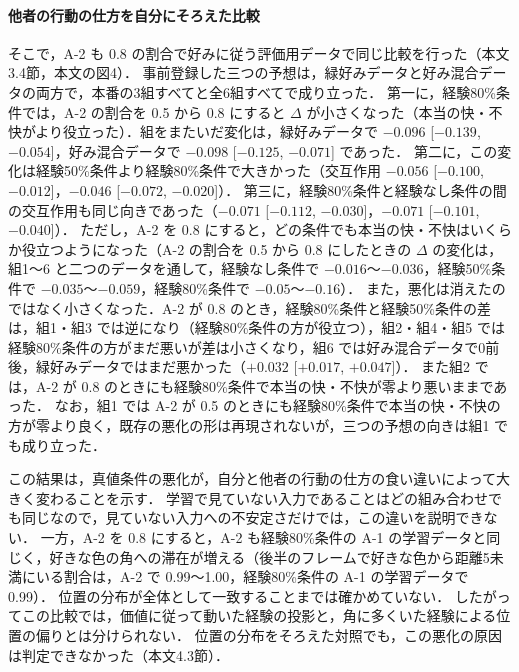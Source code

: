 \paragraph{他者の行動の仕方を自分にそろえた比較}
そこで，A-2 も 0.8 の割合で好みに従う評価用データで同じ比較を行った（本文3.4節，本文の図4）．
事前登録した三つの予想は，緑好みデータと好み混合データの両方で，本番の3組すべてと全6組すべてで成り立った．
第一に，経験80\%条件では，A-2 の割合を 0.5 から 0.8 にすると $\Delta$ が小さくなった（本当の快・不快がより役立った）．組をまたいだ変化は，緑好みデータで $-0.096$ [$-0.139$, $-0.054$]，好み混合データで $-0.098$ [$-0.125$, $-0.071$] であった．
第二に，この変化は経験50\%条件より経験80\%条件で大きかった（交互作用 $-0.056$ [$-0.100$, $-0.012$]，$-0.046$ [$-0.072$, $-0.020$]）．
第三に，経験80\%条件と経験なし条件の間の交互作用も同じ向きであった（$-0.071$ [$-0.112$, $-0.030$]，$-0.071$ [$-0.101$, $-0.040$]）．
ただし，A-2 を 0.8 にすると，どの条件でも本当の快・不快はいくらか役立つようになった（A-2 の割合を 0.5 から 0.8 にしたときの $\Delta$ の変化は，組1〜6 と二つのデータを通して，経験なし条件で $-0.016$〜$-0.036$，経験50\%条件で $-0.035$〜$-0.059$，経験80\%条件で $-0.05$〜$-0.16$）．
また，悪化は消えたのではなく小さくなった．A-2 が 0.8 のとき，経験80\%条件と経験50\%条件の差は，組1・組3 では逆になり（経験80\%条件の方が役立つ），組2・組4・組5 では経験80\%条件の方がまだ悪いが差は小さくなり，組6 では好み混合データで0前後，緑好みデータではまだ悪かった（$+0.032$ [$+0.017$, $+0.047$]）．
また組2 では，A-2 が 0.8 のときにも経験80\%条件で本当の快・不快が零より悪いままであった．
なお，組1 では A-2 が 0.5 のときにも経験80\%条件で本当の快・不快の方が零より良く，既存の悪化の形は再現されないが，三つの予想の向きは組1 でも成り立った．

この結果は，真値条件の悪化が，自分と他者の行動の仕方の食い違いによって大きく変わることを示す．
学習で見ていない入力であることはどの組み合わせでも同じなので，見ていない入力への不安定さだけでは，この違いを説明できない．
一方，A-2 を 0.8 にすると，A-2 も経験80\%条件の A-1 の学習データと同じく，好きな色の角への滞在が増える（後半のフレームで好きな色から距離5未満にいる割合は，A-2 で 0.99〜1.00，経験80\%条件の A-1 の学習データで 0.99）．
位置の分布が全体として一致することまでは確かめていない．
したがってこの比較では，価値に従って動いた経験の投影と，角に多くいた経験による位置の偏りとは分けられない．
位置の分布をそろえた対照でも，この悪化の原因は判定できなかった（本文4.3節）．
